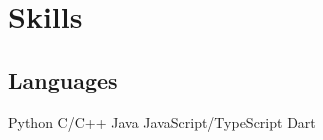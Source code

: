\documentclass[]{openfont}
\begin{document}
\begin{minipage}[t]{0.33\textwidth}








    \section{Skills}

    \subsection{Languages}
    Python \textbullet{} C/C++ \textbullet{} Java \textbullet{} JavaScript/TypeScript \textbullet{} Dart
    \sectionsep


\end{minipage}
\end{document}
